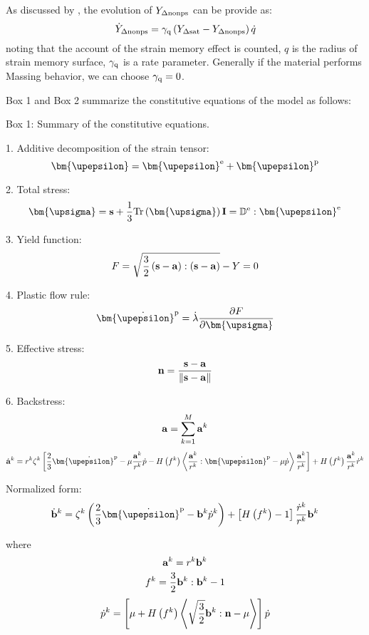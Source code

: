 As discussed by \cite{fang2015cyclic}, the evolution of ${Y_{\Delta \rm nonps}}$ can be provide as:
\begin{equation}
{\dot Y_{\Delta \rm nonps}} = {\gamma _{\rm q}}\left( {{Y_{\Delta \rm sat}} - {Y_{\Delta \rm nonps}}} \right)\dot q
\end{equation}
noting that the account of the strain memory effect is counted, $q$ is the radius of strain memory surface, ${\gamma _{\rm q}}$ is a rate parameter.
Generally if the material performs Massing behavior, we can choose ${\gamma _{\rm q}}=0$.

Box 1 and Box 2 summarize the constitutive equations of the model as follows:

\begin{framed}
\label{Box:1}
Box 1: Summary of the constitutive equations.

1. Additive decomposition of the strain tensor:
\[{\bm{\upepsilon }} = {{\bm{\upepsilon }}^{\rm{e}}} + {{\bm{\upepsilon }}^{\rm{p}}}\]

2. Total stress:
\[{\bm{\upsigma }} = {\bf{s}} + \frac{1}{3}{\rm{Tr}}\left( {\bm{\upsigma }} \right){\bf{I}} = {\mathbb{D}^{\rm{e}}}:{{\bm{\upepsilon }}^{\rm{e}}}\]

3. Yield function:
\[F = \sqrt {\frac{3}{2}\left( {{\bf{s}} - {\bf{a}}} \right):\left( {{\bf{s}} - {\bf{a}}} \right)}  - Y = 0\]

4. Plastic flow rule:
\[{{\bm{\dot \upepsilon }}^{\rm{p}}} = \dot \lambda \frac{{\partial F}}{{\partial {\bm{\upsigma }}}}\]

5. Effective stress:
\[{\bf{n}} = \frac{{{\bf{s}} - {\bf{a}}}}{{\left\| {{\bf{s}} - {\bf{a}}} \right\|}}\]

6. Backstress:
\[{\bf{a}} = \sum\limits_{k = 1}^M {{{\bf{a}}^k}} \]
\[{{\dot{\bf a}}^k} = {r^k}{\zeta ^k}\left[ {\frac{2}{3}{{{\bm{\dot \upepsilon }}}^{\rm{p}}} - \mu \frac{{{{\bf{a}}^k}}}{{{r^k}}}\dot p - H\left( {{f^k}} \right)\left\langle {\frac{{{{\bf{a}}^k}}}{{{r^k}}}:{{{\bm{\dot \upepsilon }}}^{\rm{p}}} - \mu \dot p} \right\rangle \frac{{{{\bf{a}}^k}}}{{{r^k}}}} \right] + H\left( {{f^k}} \right)\frac{{{{\bf{a}}^k}}}{{{r^k}}}{\dot r^k}\]

Normalized form:
\[{{\dot{\bf b}}^k} = {\zeta ^k}\left( {\frac{2}{3}{{{\bm{\dot \upepsilon }}}^{\rm{p}}} - {{\bf{b}}^k}{{\dot p}^k}} \right) + \left[ {H\left( {{f^k}} \right) - 1} \right]\frac{{{{\dot r}^k}}}{{{r^k}}}{{\bf{b}}^k}\]

where
\[{{\bf{a}}^k} = {r^k}{{\bf{b}}^k}\]
\[{f^k} = \frac{3}{2}{{\bf{b}}^k}:{{\bf{b}}^k} - 1\]
\[{\dot p^k} = \left[ {\mu  + H\left( {{f^k}} \right)\left\langle {\sqrt {\frac{3}{2}} {{\bf{b}}^k}:{\bf{n}} - \mu } \right\rangle } \right]\dot p\]
\end{framed}


